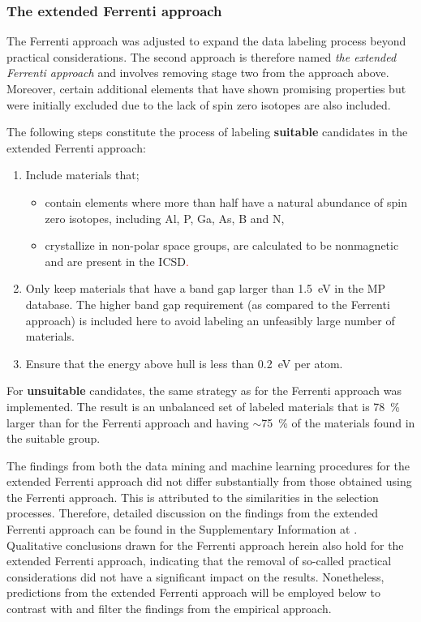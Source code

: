 \documentclass[superscriptaddress,
preprint,
 amsmath,amssymb,
 aps,
]{revtex4-2}
\newcommand{\mrk}[1]{\textcolor{red}{#1}}
\begin{document}
\subsubsection*{The extended Ferrenti approach}
The Ferrenti approach was adjusted to expand the data labeling process beyond practical  considerations. The second approach is therefore named \emph{the extended Ferrenti approach} and involves removing stage two from the approach above. Moreover, certain additional elements that have shown promising properties but were initially excluded due to the lack of spin zero isotopes are also included. 

The following steps constitute the process of labeling \textbf{suitable} candidates in the extended Ferrenti approach:
\begin{enumerate}
    \item Include materials that; 
    \begin{itemize}
        \item contain elements where more than half have a natural abundance of spin zero isotopes, including Al, P, Ga, As, B and N, 
        \item crystallize in non-polar space groups,
        are calculated to be nonmagnetic and are present in the ICSD\mrk{.}
    \end{itemize}
    \item Only keep materials that have a band gap larger than \SI{1.5}{\electronvolt} in the MP database. The higher band gap requirement (as compared to the Ferrenti approach) is included here to avoid labeling an unfeasibly large number of materials. 
    \item Ensure that the energy above hull is less than \SI{0.2}{\electronvolt} per atom. 
\end{enumerate}

For \textbf{unsuitable} candidates, the same strategy as for the Ferrenti approach was implemented. The result is an unbalanced set of labeled materials that is   \SI{78}{\percent} larger than for the Ferrenti approach and having $\sim$\SI{75}{\percent} of the materials found in the suitable group. 

The findings from both the data mining and machine learning procedures for the extended Ferrenti approach did not differ substantially from those obtained using the Ferrenti approach. This is attributed to the similarities in the selection processes. Therefore, detailed discussion on the findings from the extended Ferrenti approach can be found in the Supplementary Information at \cite{supplementary}. Qualitative conclusions drawn for the Ferrenti approach herein also hold for the extended Ferrenti approach, indicating that the removal of so-called practical considerations did not have a significant impact on the results. Nonetheless, predictions from the extended Ferrenti approach will be employed below to contrast with and filter the findings from the empirical approach.
\end{document}
